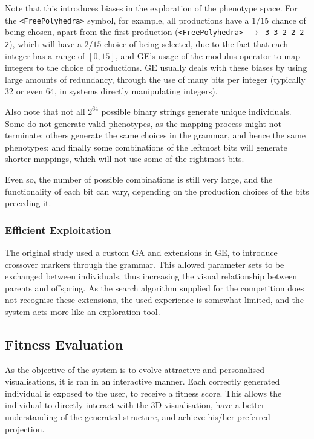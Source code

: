 \documentclass{article}
\begin{document}
Note that this introduces biases in the exploration of the phenotype space. For
the \texttt{<FreePolyhedra>} symbol, for example, all productions have a $1/15$
chance of being chosen, apart from the first production
(\texttt{<FreePolyhedra> $\rightarrow$ 3 3 2 2 2 2}), which will have a $2/15$
choice of being selected, due to the fact that each integer has a range of
$[0,15]$, and GE's usage of the modulus operator to map integers to the choice
of productions.  GE usually deals with these biases by using large amounts of
redundancy, through the use of many bits per integer (typically 32 or even 64,
in systems directly manipulating integers).

Also note that not all $2^{64}$ possible binary strings generate unique
individuals. Some do not generate valid phenotypes, as the mapping process
might not terminate; others generate the same choices in the grammar, and hence
the same phenotypes; and finally some combinations of the leftmost bits will
generate shorter mappings, which will not use some of the rightmost bits.

Even so, the number of possible combinations is still very large, and the
functionality of each bit can vary, depending on the production choices of the
bits preceding it.

\subsubsection{Efficient Exploitation}

The original study \cite{nicolau2011a} used a custom GA and extensions in GE,
to introduce crossover markers through the grammar. This allowed parameter sets
to be exchanged between individuals, thus increasing the visual relationship
between parents and offspring. As the search algorithm supplied for the
competition does not recognise these extensions, the used experience is
somewhat limited, and the system acts more like an exploration tool.

\subsection{Fitness Evaluation}

As the objective of the system is to evolve attractive and personalised
visualisations, it is ran in an interactive manner. Each correctly generated
individual is exposed to the user, to receive a fitness score. This allows the
individual to directly interact with the 3D-visualisation, have a better
understanding of the generated structure, and achieve his/her preferred
projection.
\end{document}
